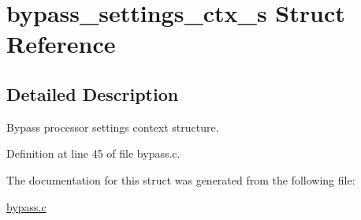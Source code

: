 \hypertarget{structbypass__settings__ctx__s}{}\section{bypass\+\_\+settings\+\_\+ctx\+\_\+s Struct Reference}
\label{structbypass__settings__ctx__s}


\subsection{Detailed Description}
Bypass processor settings context structure. 

Definition at line 45 of file bypass.\+c.



The documentation for this struct was generated from the following file\+:\begin{DoxyCompactItemize}
\item 
\hyperlink{bypass_8c}{bypass.\+c}\end{DoxyCompactItemize}
